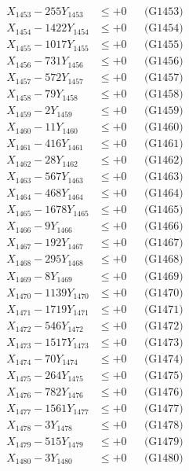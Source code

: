 \documentclass[a4paper,10pt]{article}
\begin{document}
{\begin{align}
X_{1453} - 255Y_{1453} &\leq +0 && \text{(G1453)} \\
X_{1454} - 1422Y_{1454} &\leq +0 && \text{(G1454)} \\
X_{1455} - 1017Y_{1455} &\leq +0 && \text{(G1455)} \\
X_{1456} - 731Y_{1456} &\leq +0 && \text{(G1456)} \\
X_{1457} - 572Y_{1457} &\leq +0 && \text{(G1457)} \\
X_{1458} - 79Y_{1458} &\leq +0 && \text{(G1458)} \\
X_{1459} - 2Y_{1459} &\leq +0 && \text{(G1459)} \\
X_{1460} - 11Y_{1460} &\leq +0 && \text{(G1460)} \\
\allowbreak
X_{1461} - 416Y_{1461} &\leq +0 && \text{(G1461)} \\
X_{1462} - 28Y_{1462} &\leq +0 && \text{(G1462)} \\
X_{1463} - 567Y_{1463} &\leq +0 && \text{(G1463)} \\
X_{1464} - 468Y_{1464} &\leq +0 && \text{(G1464)} \\
X_{1465} - 1678Y_{1465} &\leq +0 && \text{(G1465)} \\
X_{1466} - 9Y_{1466} &\leq +0 && \text{(G1466)} \\
X_{1467} - 192Y_{1467} &\leq +0 && \text{(G1467)} \\
X_{1468} - 295Y_{1468} &\leq +0 && \text{(G1468)} \\
X_{1469} - 8Y_{1469} &\leq +0 && \text{(G1469)} \\
X_{1470} - 1139Y_{1470} &\leq +0 && \text{(G1470)} \\
\allowbreak
X_{1471} - 1719Y_{1471} &\leq +0 && \text{(G1471)} \\
X_{1472} - 546Y_{1472} &\leq +0 && \text{(G1472)} \\
X_{1473} - 1517Y_{1473} &\leq +0 && \text{(G1473)} \\
X_{1474} - 70Y_{1474} &\leq +0 && \text{(G1474)} \\
X_{1475} - 264Y_{1475} &\leq +0 && \text{(G1475)} \\
X_{1476} - 782Y_{1476} &\leq +0 && \text{(G1476)} \\
X_{1477} - 1561Y_{1477} &\leq +0 && \text{(G1477)} \\
X_{1478} - 3Y_{1478} &\leq +0 && \text{(G1478)} \\
X_{1479} - 515Y_{1479} &\leq +0 && \text{(G1479)} \\
X_{1480} - 3Y_{1480} &\leq +0 && \text{(G1480)} \\

\end{align}}
\end{document}
